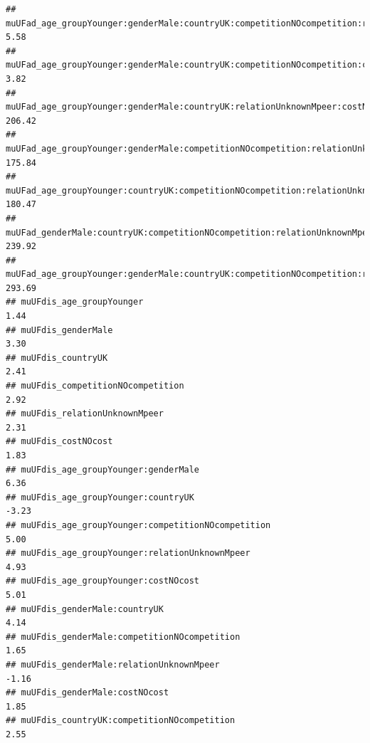 \documentclass[
]{article}
\begin{document}
\begin{verbatim}
## muUFad_age_groupYounger:genderMale:countryUK:competitionNOcompetition:relationUnknownMpeer                 5.58
## muUFad_age_groupYounger:genderMale:countryUK:competitionNOcompetition:costNOcost                           3.82
## muUFad_age_groupYounger:genderMale:countryUK:relationUnknownMpeer:costNOcost                             206.42
## muUFad_age_groupYounger:genderMale:competitionNOcompetition:relationUnknownMpeer:costNOcost              175.84
## muUFad_age_groupYounger:countryUK:competitionNOcompetition:relationUnknownMpeer:costNOcost               180.47
## muUFad_genderMale:countryUK:competitionNOcompetition:relationUnknownMpeer:costNOcost                     239.92
## muUFad_age_groupYounger:genderMale:countryUK:competitionNOcompetition:relationUnknownMpeer:costNOcost    293.69
## muUFdis_age_groupYounger                                                                                   1.44
## muUFdis_genderMale                                                                                         3.30
## muUFdis_countryUK                                                                                          2.41
## muUFdis_competitionNOcompetition                                                                           2.92
## muUFdis_relationUnknownMpeer                                                                               2.31
## muUFdis_costNOcost                                                                                         1.83
## muUFdis_age_groupYounger:genderMale                                                                        6.36
## muUFdis_age_groupYounger:countryUK                                                                        -3.23
## muUFdis_age_groupYounger:competitionNOcompetition                                                          5.00
## muUFdis_age_groupYounger:relationUnknownMpeer                                                              4.93
## muUFdis_age_groupYounger:costNOcost                                                                        5.01
## muUFdis_genderMale:countryUK                                                                               4.14
## muUFdis_genderMale:competitionNOcompetition                                                                1.65
## muUFdis_genderMale:relationUnknownMpeer                                                                   -1.16
## muUFdis_genderMale:costNOcost                                                                              1.85
## muUFdis_countryUK:competitionNOcompetition                                                                 2.55

\end{verbatim}
\end{document}
